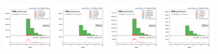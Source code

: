 \begin{figure}
    \includegraphics[width=0.24\textwidth]{appendices/qcdSF/figures/4j1b/mu_nJets_True_mcqcd.png}
    \includegraphics[width=0.24\textwidth]{appendices/qcdSF/figures/4j1b/mu_nJets_False.png}
    \includegraphics[width=0.24\textwidth]{appendices/qcdSF/figures/4j1b/e_nJets_True_mcqcd.png}
    \includegraphics[width=0.24\textwidth]{appendices/qcdSF/figures/4j1b/e_nJets_False.png}
    

\end{figure}
